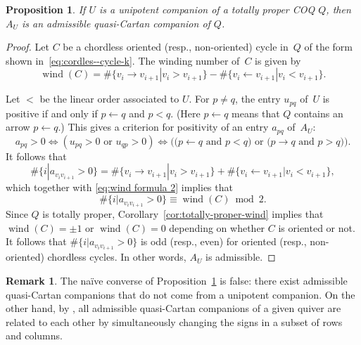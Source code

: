 \documentclass[11pt, letterpaper]{amsart}
\newtheorem{proposition}[theorem]{Proposition}
\theoremstyle{definition}
\newtheorem{remark}[theorem]{Remark}
\numberwithin{equation}{section}
\def\wind{{\operatorname{wind}}}
\begin{document}
\begin{proposition}
\label{pr:admissible-qC-vs-U}
If $U$ is a unipotent companion of a totally proper COQ $Q$, then $A_U$ is an admissible quasi-Cartan companion of $Q$.
\end{proposition}

\begin{proof}
Let $C$ be a chordless oriented (resp., non-oriented) cycle in~$Q$
of the form shown in~\eqref{eq:cordles--cycle-k}. 
The winding number of~$C$ is given by 
\begin{equation}
\label{eq:wind formula 2}
\wind(C) = \# \{v_i \rightarrow v_{i+1} | v_i > v_{i+1} \} - \# \{ v_i \leftarrow v_{i+1} | v_i < v_{i+1} \}. 
\end{equation}

Let $<$ be the linear order associated to $U$. 
For $p\ne q$, the entry $u_{pq}$ of~$U$ is positive if and only if $p\leftarrow q$ and $p< q$. 
(Here $p\leftarrow q$ means that $Q$ contains an arrow $p\leftarrow q$.) 
This gives a criterion for positivity of an entry $a_{pq}$ of~$A_U$: 
\begin{equation*}
a_{pq}>0 \Leftrightarrow (u_{pq}>0\text{ or }u_{qp}>0) \Leftrightarrow 
\text{(($p\leftarrow q$ and $p< q$) or ($p\rightarrow q$ and $p>q$)).}
\end{equation*}
It follows that
\begin{equation*}
\#\{ i | a_{v_i v_{i+1}} > 0 \} 
= \#\{v_i \rightarrow v_{i+1} | v_i > v_{i+1} \} + \#\{ v_i \leftarrow v_{i+1} | v_i < v_{i+1} \}, 
\end{equation*}
which together with \eqref{eq:wind formula 2} implies that 
\begin{equation*}
\#\{ i | a_{v_i v_{i+1}} > 0 \} \equiv \wind(C)  \bmod 2. 
\end{equation*}
Since $Q$ is totally proper, Corollary~\ref{cor:totally-proper-wind}
implies that $\wind(C)=\pm1$ or $\wind(C)=0$ depending on whether $C$ is oriented or not. 
It follows that $\#\{ i | a_{v_i v_{i+1}} > 0 \}$ is odd (resp., even) for oriented (resp., non-oriented) chordless cycles.
In other words, $A_U$ is admissible.
\end{proof}

\begin{remark}
The na\"ive converse of Proposition~\ref{pr:admissible-qC-vs-U} is false:
there exist admissible quasi-Cartan companions that do not come from a unipotent companion. 
On the other hand, by \cite[Theorem~2.11]{SevenOtherPaper}, 
all admissible quasi-Cartan companions of a given quiver are related to each other
by simultaneously changing the signs in a subset of rows and columns.
\end{remark}
\end{document}
